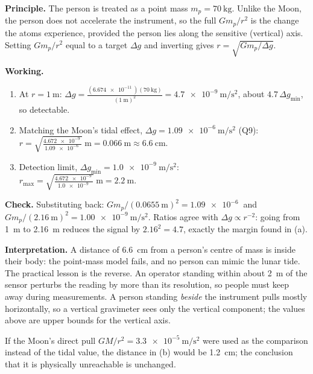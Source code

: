 \documentclass[11pt]{article}
\begin{document}
\textbf{Principle.} The person is treated as a point mass $m_p = \SI{70}{\kilogram}$. Unlike the
Moon, the person does not accelerate the instrument, so the full $Gm_p/r^2$ is the change the atoms
experience, provided the person lies along the sensitive (vertical) axis. Setting
$Gm_p/r^2$ equal to a target $\Delta g$ and inverting gives $r = \sqrt{Gm_p/\Delta g}$.

\textbf{Working.}
\begin{enumerate}[label=(\alph*), nosep, leftmargin=*]
\item At $r = \SI{1}{\metre}$:
$\displaystyle \Delta g = \frac{(\SI{6.674e-11}{})(\SI{70}{\kilogram})}{(\SI{1}{\metre})^2}
= \SI{4.7e-9}{\metre\per\second\squared}$, about $4.7\,\Delta g_{\min}$, so detectable.
\item Matching the Moon's tidal effect, $\Delta g = \SI{1.09e-6}{\metre\per\second\squared}$ (Q9):\\
$\displaystyle r = \sqrt{\frac{\SI{4.672e-9}{}}{\SI{1.09e-6}{}}}\ \si{\metre} = \SI{0.066}{\metre}\approx\SI{6.6}{\centi\metre}.$
\item Detection limit, $\Delta g_{\min} = \SI{1.0e-9}{\metre\per\second\squared}$:\\
$\displaystyle r_{\max} = \sqrt{\frac{\SI{4.672e-9}{}}{\SI{1.0e-9}{}}}\ \si{\metre} = \SI{2.2}{\metre}.$
\end{enumerate}

\textbf{Check.} Substituting back: $Gm_p/(\SI{0.0655}{\metre})^2 = \SI{1.09e-6}{}$ and
$Gm_p/(\SI{2.16}{\metre})^2 = \SI{1.00e-9}{\metre\per\second\squared}$. Ratios agree with
$\Delta g\propto r^{-2}$: going from \SI{1}{\metre} to \SI{2.16}{\metre} reduces the signal by
$2.16^2 = 4.7$, exactly the margin found in (a).

\textbf{Interpretation.} A distance of \SI{6.6}{\centi\metre} from a person's centre of mass is
inside their body: the point-mass model fails, and no person can mimic the lunar tide. The practical
lesson is the reverse. An operator standing within about \SI{2}{\metre} of the sensor perturbs the
reading by more than its resolution, so people must keep away during measurements. A person standing
\emph{beside} the instrument pulls mostly horizontally, so a vertical gravimeter sees only the vertical
component; the values above are upper bounds for the vertical axis.

\begin{notebox}
If the Moon's direct pull $GM/r^2 = \SI{3.3e-5}{\metre\per\second\squared}$ were used as the
comparison instead of the tidal value, the distance in (b) would be \SI{1.2}{\centi\metre}; the
conclusion that it is physically unreachable is unchanged.
\end{notebox}
\end{document}
